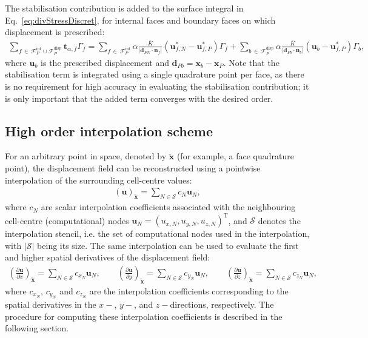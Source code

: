 \documentclass[sn-mathphys,Numbered]{sn-jnl}%
\newcommand{\bb}{\boldsymbol}
\begin{document}
The stabilisation contribution is added to the surface integral in Eq.~\eqref{eq:divStressDiscret}, for internal faces and boundary faces on which displacement is prescribed:
\begin{eqnarray}
\sum_{f \,\in\, \mathcal{F}_P^{\text{int}} \cup \mathcal{F}_P^{\text{disp}}} \bb{t}_{\alpha, f} \Gamma_f =
\sum_{f \,\in\, \mathcal{F}_P^{\text{int}}}  \alpha \frac{\bar{K}}{|\bb{d}_{PN} \cdot \bb{n}_f|}(\bb{u}_{f,N}^*-\bb{u}_{f,P}^*)\Gamma_f
+
\sum_{b \,\in\, \mathcal{F}_P^{\text{disp}}}  \alpha \frac{\bar{K}}{|\bb{d}_{Pb} \cdot \bb{n}_b|}(\bb{u}_{b}-\bb{u}_{f,P}^*)\Gamma_b,
\end{eqnarray}
where $\bb{u}_{b}$ is the prescribed displacement and $\bb{d}_{Pb}=\bb{x}_b - \bb{x}_P$. Note that the stabilisation term is integrated using a single quadrature point per face, as there is no requirement for high accuracy in evaluating the stabilisation contribution; it is only important that the added term converges with the desired order.
%
\subsection{High order interpolation scheme}
\label{sec:ho_scheme}
%
For an arbitrary point in space, denoted by $\tilde{\bb{x}}$ (for example, a face quadrature point), the displacement field can be reconstructed using a pointwise interpolation of the surrounding cell-centre values:
%
\begin{eqnarray}\label{eq:interp}
(\bb{u})_{\tilde{\bb{x}}} = \sum_{N \in \mathcal{S}}c_N \bb{u}_N,
\end{eqnarray}
%
where $c_N$ are scalar interpolation coefficients associated with the neighbouring cell-centre (computational) nodes $\bb{u}_N=(u_{x,N}, u_{y,N}, u_{z,N})^{\mathrm{T}}$, and $\mathcal{S}$ denotes the interpolation stencil, i.e. the set of computational nodes used in the interpolation, with $|\mathcal{S}|$ being its size.
The same interpolation can be used to evaluate the first and higher spatial derivatives of the displacement field:
%
\begin{eqnarray}\label{eq:derInterp}
\left(\frac{\partial \bb{u}}{\partial x}\right)_{\tilde{\bb{x}}}=\sum_{N \in \mathcal{S}}c_{x_N} \bb{u}_N, \qquad
\left(\frac{\partial \bb{u}}{\partial y}\right)_{\tilde{\bb{x}}}=\sum_{N \in \mathcal{S}}c_{y_N} \bb{u}_N, \qquad
\left(\frac{\partial \bb{u}}{\partial z}\right)_{\tilde{\bb{x}}}=\sum_{N \in \mathcal{S}}c_{z_N} \bb{u}_N,
\end{eqnarray}
%
where $c_{x_N}$, $c_{y_N}$ and $c_{z_N}$ are the interpolation coefficients corresponding to the spatial derivatives in the $x-$, $y-$, and $z-$directions, respectively.
The procedure for computing these interpolation coefficients is described in the following section.
%
\end{document}
